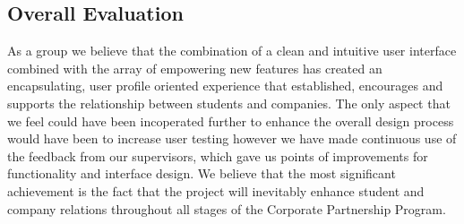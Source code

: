 \subsection{Overall Evaluation}
  As a group we believe that the combination of a clean and intuitive user interface combined with the array of empowering new features has created an encapsulating, user profile oriented experience that established, encourages and supports the relationship between students and companies.
  The only aspect that we feel could have been incoperated further to enhance the overall design process would have been to increase user testing however we have made continuous use of the feedback from our supervisors, which gave us points of improvements for functionality and interface design.
  We believe that the most significant achievement is the fact that the project will inevitably enhance student and company relations throughout all stages of the Corporate Partnership Program.
